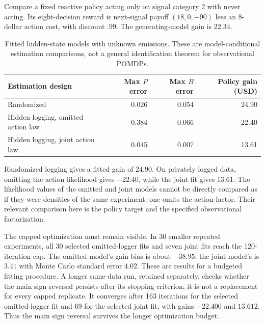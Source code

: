 Compare a fixed reactive policy acting only on signal category 2 with
never acting. Its eight-decision reward is next-signal payoff
$(18,0,-90)$ less an $8$-dollar action cost, with discount $.99$.
The generating-model gain is $22.34$.

\begin{table}[htbp]\centering\small


\begin{tabular}{@{}lrrr@{}}
\toprule
Estimation design & Max $P$ error & Max $B$ error & Policy gain (USD)\\
\midrule
Randomized & 0.026 & 0.054 & 24.90\\
Hidden logging, omitted action law & 0.384 & 0.066 & -22.40\\
Hidden logging, joint action law & 0.045 & 0.007 & 13.61\\
\bottomrule
\end{tabular}



\caption{Fitted hidden-state models with unknown emissions. These are
model-conditional estimation comparisons, not a general identification
theorem for observational POMDPs.}
\end{table}

Randomized logging gives a fitted gain of $24.90$. On privately logged
data, omitting the action likelihood gives $-22.40$, while the joint
fit gives $13.61$. The likelihood values of the omitted and joint
models cannot be directly compared as if they were densities of the
same experiment: one omits the action factor. Their relevant comparison
here is the policy target and the specified observational factorization.

The capped optimization must remain visible. In 30 smaller repeated
experiments, all 30 selected omitted-logger fits and seven joint fits
reach the 120-iteration cap. The omitted model's gain bias is about
$-38.95$; the joint model's is $3.41$ with Monte Carlo standard error
$4.02$. These are results for a budgeted fitting procedure. A longer
same-data run, retained separately, checks whether the main sign
reversal persists after its stopping criterion; it is not a replacement
for every capped replicate.
It converges after 163 iterations for the selected omitted-logger fit
and 69 for the selected joint fit, with gains $-22.400$ and $13.612$.
Thus the main sign reversal survives the longer optimization budget.

